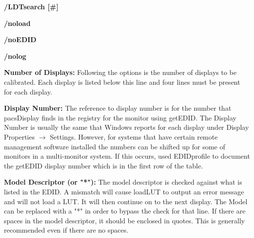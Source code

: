 \textbf{/LDTsearch [\#]}


\textbf{/noload}


\textbf{/noEDID}


\textbf{/nolog}


\textbf{Number of Displays:} Following the options is the number of displays to be calibrated. Each display is listed below this line and four lines must be present for each display. 

\textbf{Display Number:} The reference to display number is for the number that pacsDisplay finds in the registry for the monitor using getEDID. The Display Number is usually the same that Windows reports for each display under Display Properties $\rightarrow$ Settings. However, for systems that have certain remote management software installed the numbers can be shifted up for some of monitors in a multi-monitor system. If this occurs, used EDIDprofile to document the getEDID display number which is in the first row of the table. 

\textbf{Model Descriptor (or "*"):} The model descriptor is checked against what is listed in the EDID. A mismatch will cause loadLUT to output an error message and will not load a LUT. It will then continue on to the next display. The Model can be replaced with a "*" in order to bypass the check for that line. If there are spaces in the model descriptor, it should be enclosed in quotes. This is generally recommended even if there are no spaces. 

